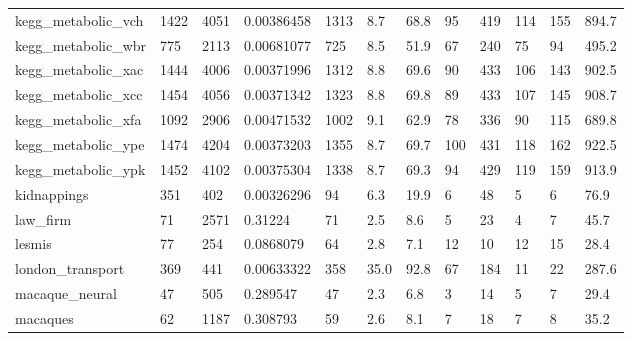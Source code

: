 \begin{longtable}{llllllllllll}
 kegg\_metabolic\_vch                                 & 1422       & 4051      & 0.00386458  & 1313  & 8.7    & 68.8   & 95    & 419    & 114    & 155    & 894.7   \\
 kegg\_metabolic\_wbr                                 & 775        & 2113      & 0.00681077  & 725   & 8.5    & 51.9   & 67    & 240    & 75     & 94     & 495.2   \\
 kegg\_metabolic\_xac                                 & 1444       & 4006      & 0.00371996  & 1312  & 8.8    & 69.6   & 90    & 433    & 106    & 143    & 902.5   \\
 kegg\_metabolic\_xcc                                 & 1454       & 4056      & 0.00371342  & 1323  & 8.8    & 69.8   & 89    & 433    & 107    & 145    & 908.7   \\
 kegg\_metabolic\_xfa                                 & 1092       & 2906      & 0.00471532  & 1002  & 9.1    & 62.9   & 78    & 336    & 90     & 115    & 689.8   \\
 kegg\_metabolic\_ype                                 & 1474       & 4204      & 0.00373203  & 1355  & 8.7    & 69.7   & 100   & 431    & 118    & 162    & 922.5   \\
 kegg\_metabolic\_ypk                                 & 1452       & 4102      & 0.00375304  & 1338  & 8.7    & 69.3   & 94    & 429    & 119    & 159    & 913.9   \\
 kidnappings                                        & 351        & 402       & 0.00326296  & 94    & 6.3    & 19.9   & 6     & 48     & 5      & 6      & 76.9    \\
 law\_firm                                           & 71         & 2571      & 0.31224     & 71    & 2.5    & 8.6    & 5     & 23     & 4      & 7      & 45.7    \\
 lesmis                                             & 77         & 254       & 0.0868079   & 64    & 2.8    & 7.1    & 12    & 10     & 12     & 15     & 28.4    \\
 london\_transport                                   & 369        & 441       & 0.00633322  & 358   & 35.0   & 92.8   & 67    & 184    & 11     & 22     & 287.6   \\
 macaque\_neural                                     & 47         & 505       & 0.289547    & 47    & 2.3    & 6.8    & 3     & 14     & 5      & 7      & 29.4    \\
 macaques                                           & 62         & 1187      & 0.308793    & 59    & 2.6    & 8.1    & 7     & 18     & 7      & 8      & 35.2    \\

\end{longtable}
